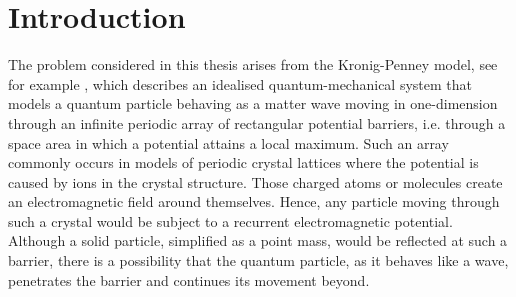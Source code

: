 \chapter{Introduction} \label{chap:1}

The problem considered in this thesis arises from the Kronig-Penney model, see for example \cite[Chapter 3]{heering2002elektrophysik}, which describes an idealised quantum-mechanical system that models a quantum particle behaving as a matter wave moving in one-dimension through an infinite periodic array of rectangular potential barriers, i.e. through a space area in which a potential attains a local maximum. Such an array commonly occurs in models of periodic crystal lattices where the potential is caused by ions in the crystal structure. Those charged atoms or molecules create an electromagnetic field around themselves. Hence, any particle moving through such a crystal would be subject to a recurrent electromagnetic potential. Although a solid particle, simplified as a point mass, would be reflected at such a barrier, there is a possibility that the quantum particle, as it behaves like a wave, penetrates the barrier and continues its movement beyond. 
~\\

